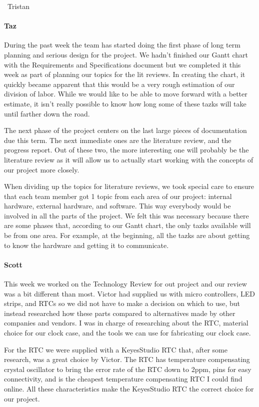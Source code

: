 \documentclass[onecolumn, draftclsnofoot,10pt, compsoc]{IEEEtran}
\begin{document}
~Tristan
\paragraph{Taz}
During the past week the team has started doing the first phase of long term planning and serious design for the project. We hadn't finished our Gantt chart with the Requirements and Specifications document but we completed it this week as part of planning our topics for the lit reviews. In creating the chart, it quickly became apparent that this would be a very rough estimation of our division of labor. While we would like to be able to move forward with a better estimate, it isn't really possible to know how long some of these tazks will take until farther down the road.

The next phase of the project centers on the last large pieces of documentation due this term. The next immediate ones are the literature review, and the progress report. Out of these two, the more interesting one will probably be the literature review as it will allow us to actually start working with the concepts of our project more closely.

When dividing up the topics for literature reviews, we took special care to ensure that each team member got 1 topic from each area of our project: internal hardware, external hardware, and software. This way everybody would be involved in all the parts of the project. We felt this was necessary because there are some phases that, according to our Gantt chart, the only tazks available will be from one area. For example, at the beginning, all the tazks are about getting to know the hardware and getting it to communicate.
\paragraph{Scott}
This week we worked on the Technology Review for out project and our review was a bit different than most. Victor had supplied us with micro controllers, LED strips, and RTCs so we did not have to make a decision on which to use, but instead researched how these parts compared to alternatives made by other companies and vendors. I was in charge of researching about the RTC, material choice for our clock case, and the tools we can use for fabricating our clock case.

For the RTC we were supplied with a KeyesStudio RTC that, after some research, was a great choice by Victor. The RTC has temperature compensating crystal oscillator to bring the error rate of the RTC down to 2ppm, pins for easy connectivity, and is the cheapest temperature compensating RTC I could find online. All these characteristics make the KeyesStudio RTC the correct choice for our project.
\end{document}

